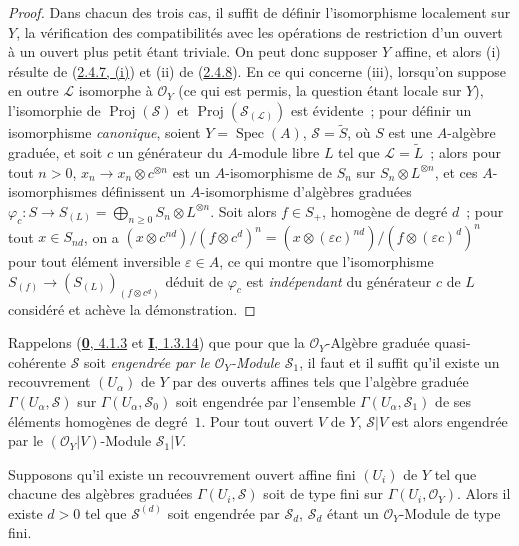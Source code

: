 \begin{proof}
Dans chacun des trois cas, il suffit de définir l'isomorphisme localement sur
$Y$, la vérification des compatibilités avec les opérations de restriction
d'un ouvert à un ouvert plus petit étant triviale. On peut donc supposer $Y$
affine, et alors (i) résulte de (\hyperref[II.2.4.7-fr]{2.4.7, (i)}) et (ii)
de (\hyperref[II.2.4.8-fr]{2.4.8}). En ce qui concerne (iii), lorsqu'on
suppose en outre $\mathcal{L}$ isomorphe à $\mathcal{O}_Y$ (ce qui est permis,
la question étant locale sur $Y$), l'isomorphie de
$\operatorname{Proj}(\mathcal{S})$ et
$\operatorname{Proj}(\mathcal{S}_{(\mathcal{L})})$ est évidente~; pour
définir un isomorphisme \emph{canonique}, soient
$Y=\operatorname{Spec}(A)$, $\mathcal{S}=\widetilde{S}$, où $S$ est une
$A$-algèbre graduée, et soit $c$ un générateur du $A$-module libre $L$ tel
que $\mathcal{L}=\widetilde{L}$~; alors pour tout $n>0$,
$x_n\to x_n\otimes c^{\otimes n}$ est un $A$-isomorphisme de $S_n$ sur
$S_n\otimes L^{\otimes n}$, et ces $A$-isomorphismes définissent un
$A$-isomorphisme d'algèbres graduées
$\varphi_c:S\to S_{(L)}
=\bigoplus_{n\geq0}S_n\otimes L^{\otimes n}$.
Soit alors $f\in S_+$, homogène de degré $d$~; pour tout $x\in S_{nd}$, on a
$(x\otimes c^{nd})/(f\otimes c^d)^n
=(x\otimes(\varepsilon c)^{nd})/(f\otimes(\varepsilon c)^d)^n$
pour tout élément inversible $\varepsilon\in A$, ce qui montre que
l'isomorphisme $S_{(f)}\to(S_{(L)})_{(f\otimes c^d)}$ déduit de $\varphi_c$
est \emph{indépendant} du générateur $c$ de $L$ considéré et achève la
démonstration.
\end{proof}

\begin{env}[3.1.9]
\label{II.3.1.9-fr}
Rappelons (\hyperref[0.4.1.3-fr]{\textbf{0}, 4.1.3} et
\hyperref[I.1.3.14-fr]{\textbf{I}, 1.3.14}) que pour que la
$\mathcal{O}_Y$-Algèbre graduée quasi-cohérente $\mathcal{S}$ soit
\emph{engendrée par le $\mathcal{O}_Y$-Module $\mathcal{S}_1$}, il faut et il
suffit qu'il existe un recouvrement $(U_\alpha)$ de $Y$ par des ouverts
affines tels que l'algèbre graduée $\Gamma(U_\alpha,\mathcal{S})$ sur
$\Gamma(U_\alpha,\mathcal{S}_0)$ soit engendrée par l'ensemble
$\Gamma(U_\alpha,\mathcal{S}_1)$ de ses éléments homogènes de degré~$1$. Pour
tout ouvert $V$ de $Y$, $\mathcal{S}|V$ est alors engendrée par le
$(\mathcal{O}_Y|V)$-Module $\mathcal{S}_1|V$.
\end{env}

\begin{proposition}[3.1.10]
\label{II.3.1.10-fr}
Supposons qu'il existe un recouvrement ouvert affine fini $(U_i)$ de $Y$ tel
que chacune des algèbres graduées $\Gamma(U_i,\mathcal{S})$ soit de type fini
sur $\Gamma(U_i,\mathcal{O}_Y)$. Alors il existe $d>0$ tel que
$\mathcal{S}^{(d)}$ soit engendrée par $\mathcal{S}_d$, $\mathcal{S}_d$ étant
un $\mathcal{O}_Y$-Module de type fini.
\end{proposition}


